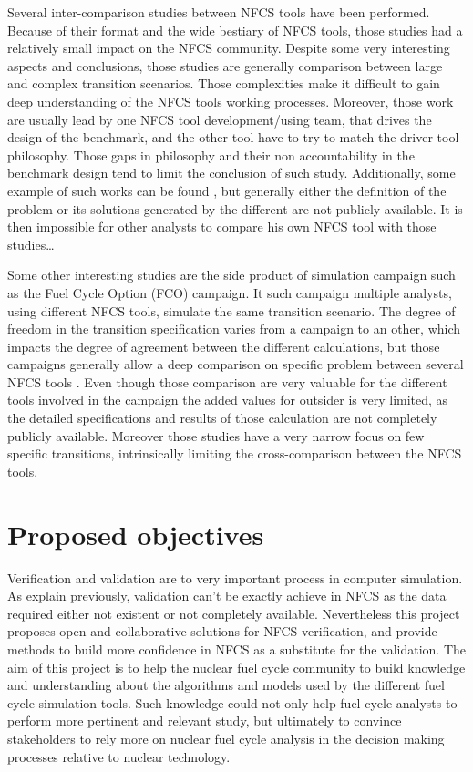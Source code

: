 Several inter-comparison studies between NFCS tools have been performed. Because
of their format and the wide bestiary of NFCS tools, those studies had a
relatively small impact on the NFCS community. Despite some very interesting
aspects and conclusions, those studies are generally comparison between large
and complex transition scenarios. Those complexities make it difficult to gain
deep understanding of the NFCS tools working processes. Moreover, those work are
usually lead by one NFCS tool development/using team, that drives the design of
the benchmark, and the other tool have to try to match the driver tool
philosophy. Those gaps in philosophy and their non accountability in the
benchmark design tend to limit the conclusion of such study. Additionally, some
example of such works can be found \cite{IAEA - Benchmark Study on Nuclear Fuel Cycle
Transition Scenarios} \cite{MIT - Guerin}, but generally either the definition
of the problem or its solutions generated by the different are not publicly
available. It is then impossible for other analysts to compare his own NFCS tool with
those studies\ldots

Some other interesting studies are the side product of simulation campaign such
as the Fuel Cycle Option (FCO) campaign. It such campaign multiple analysts,
using different NFCS tools, simulate the same transition scenario. The degree of
freedom in the transition specification varies from a campaign to an other,
which impacts the degree of agreement between the different calculations, but
those campaigns generally allow a deep comparison on specific problem between
several NFCS tools \cite{Standardized verification of fuel cycle modeling -
B.Feng}.  Even though those comparison are very valuable for the different tools
involved in the campaign the added values for outsider is very limited, as the
detailed specifications and results of those calculation are not completely
publicly available. Moreover those studies have a very narrow focus on few
specific transitions, intrinsically limiting the cross-comparison between the
NFCS tools.


\section{Proposed objectives}

Verification and validation are to very important process in computer
simulation. As explain previously, validation can't be exactly achieve in NFCS
as the data required either not existent or not completely available.
Nevertheless this project proposes open and collaborative solutions for NFCS
verification, and provide methods to build more confidence in NFCS as a
substitute for the validation.
The aim of this project is to help the nuclear fuel cycle community to build
knowledge and understanding about the algorithms and models used by the
different fuel cycle simulation tools. Such knowledge could not only help fuel
cycle analysts to perform more pertinent and relevant study, but ultimately to
convince stakeholders to rely more on nuclear fuel cycle analysis in the
decision making processes relative to nuclear technology.



